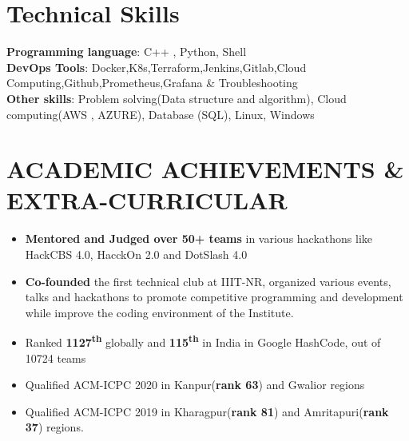 \documentclass[letterpaper,11pt]{article}
\newcommand{\achievementItem}[1]{
  \item\small{
    {#1 \vspace{-6pt}}
  }
}
\begin{document}
\section{Technical Skills}
 \begin{itemize}[leftmargin=0.15in, label={}]
    {\item{
     \textbf{Programming language}{: C++ , Python, Shell} \\
     \vspace{1pt}
     \textbf{DevOps Tools}{: Docker,K8s,Terraform,Jenkins,Gitlab,Cloud Computing,Github,Prometheus,Grafana & Troubleshooting} \\
     \vspace{1pt}
     \textbf{Other skills}{: Problem solving(Data structure and algorithm), Cloud computing(AWS , AZURE), Database (SQL), Linux, Windows} \\
    }}
 \end{itemize}
 \vspace{-16pt}



\section{ACADEMIC ACHIEVEMENTS \& EXTRA-CURRICULAR}

\begin{itemize}[leftmargin=0.2in]
  \achievementItem{\textbf{Mentored and Judged over 50+ teams} in various hackathons like HackCBS 4.0, HacckOn 2.0 and DotSlash 4.0}
  \achievementItem{\textbf{Co-founded}  the  first  technical  club  at  IIIT-NR,  organized  various  events, talks and hackathons to  promote competitive programming and development while improve the coding environment of the Institute.}
  \achievementItem{Ranked \textbf{1127\textsuperscript{th}} globally and \textbf{115\textsuperscript{th}} in India in Google HashCode, out of 10724 teams}
  \achievementItem{Qualified ACM-ICPC 2020 in Kanpur(\textbf{rank 63}) and Gwalior regions}
  \achievementItem{Qualified ACM-ICPC 2019 in Kharagpur(\textbf{rank 81}) and Amritapuri(\textbf{rank 37}) regions.}
\end{itemize}
\end{document}
